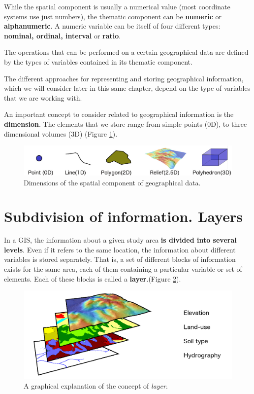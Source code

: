 While the spatial component is usually a numerical value (most coordinate systems use just numbers), the thematic component can be \textbf{numeric} or \textbf{alphanumeric}. A numeric variable can be itself of four different types: \textbf{nominal, ordinal, interval} or \textbf{ratio}.

The operations that can be performed on a certain geographical data are defined by the types of variables contained in its thematic component.

The different approaches for representing and storing geographical information, which we will consider later in this same chapter, depend on the type of variables that we are working with.

An important concept to consider related to geographical information is the \textbf{dimension}. The elements that we store range from simple points (0D), to three-dimensional volumes (3D) (Figure \ref{Fig:Dimensions}).

\begin{figure}[!hbt] 
\centering
\includegraphics[width=\textwidth]{Data/Dimensions.png}
\caption{\small Dimensions of the spatial component of geographical data.}
\label{Fig:Dimensions} 
\end{figure}


\section{Subdivision of information. Layers}

In a GIS, the information about a given study area \textbf{is divided into several levels}. Even if it refers to the same location, the information about different variables is stored separately. That is, a set of different blocks of information exists for the same area, each of them containing a particular variable or set of elements. Each of these blocks is called a \textbf{layer}.(Figure \ref{Fig:Concept_layer}). 

\begin{figure}[!hbt] 
\centering
\includegraphics[width=\textwidth]{Data/Concept_layer.png}
\caption{\small A graphical explanation of the concept of \emph{layer}.}
\label{Fig:Concept_layer} 
\end{figure}

